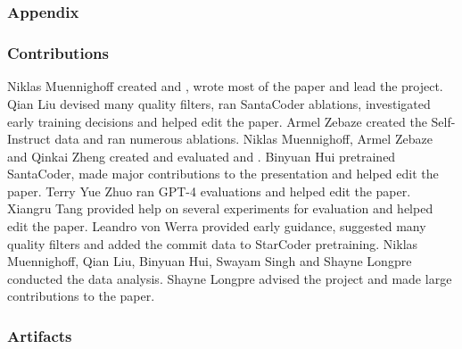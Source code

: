 \newpage
\appendix

\part{}
\section*{\centering \LARGE{\textbf{Appendix}}}
\parttoc

\newpage

\section{Contributions}
\label{sec:contributions}

Niklas Muennighoff created \data{} and \eval{}, wrote most of the paper and lead the project. Qian Liu devised many quality filters, ran SantaCoder ablations, investigated early training decisions and helped edit the paper. Armel Zebaze created the Self-Instruct data and ran numerous ablations. Niklas Muennighoff, Armel Zebaze and Qinkai Zheng created and evaluated \model{} and \modelx{}. Binyuan Hui pretrained SantaCoder, made major contributions to the presentation and helped edit the paper. Terry Yue Zhuo ran GPT-4 evaluations and helped edit the paper. Xiangru Tang provided help on several experiments for evaluation and helped edit the paper. Leandro von Werra provided early guidance, suggested many quality filters and added the commit data to StarCoder pretraining. Niklas Muennighoff, Qian Liu, Binyuan Hui, Swayam Singh and Shayne Longpre conducted the data analysis. Shayne Longpre advised the project and made large contributions to the paper.



\section{Artifacts}
\label{sec:artifacts}

